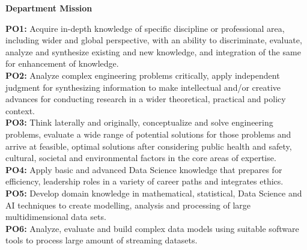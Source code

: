 \vspace{0.5cm} 
\begin{center}
	\textcolor{midnight}{\Large \textbf{Department Mission}}\\
	\begin{tcolorbox}[colback=golden!5!white,colframe=golden!75!black]
				\itshape \DepartmentMission
	\end{tcolorbox}
\end{center}

\vspace{0.5cm} 


\newpage

\begin{tcolorbox}[ enhanced, left=2mm, right=2mm, width=14cm, attach boxed title to top center={yshift=-3mm,yshifttext=-1mm}, 
	valign=center,
	colback=gray!5!white,colframe=black!75!black,colbacktitle=gray!90!black,
	title=\large Program Outcomes (POs), fonttitle=\bfseries,
	boxed title style={size=small,colframe=gray!90!black} ]
	{\scriptsize
	
	\textbf{PO1: }Acquire in-depth knowledge of specific discipline or professional area, including wider and global perspective, with an ability to discriminate, evaluate, analyze and synthesize existing and new knowledge, and integration of the same for enhancement of knowledge.\\
	\textbf{PO2: } Analyze complex engineering problems critically, apply independent judgment for synthesizing information to make intellectual and/or creative advances for conducting research in a wider theoretical, practical and policy context.\\
	\textbf{PO3: }Think laterally and originally, conceptualize and solve engineering problems, evaluate a wide range of potential solutions for those problems and arrive at feasible, optimal solutions after considering public health and safety, cultural, societal and environmental factors in the core areas of expertise.\\
	\textbf{PO4: } Apply basic and advanced Data Science knowledge that prepares for efficiency, leadership roles in a variety of career paths and integrates ethics.\\
	\textbf{PO5: } Develop domain knowledge in mathematical, statistical, Data Science and AI techniques to create modelling, analysis and processing of large multidimensional data sets.\\
	\textbf{PO6: } Analyze, evaluate and build complex data models using suitable software tools to process large amount of streaming datasets.\\

}
\end{tcolorbox}



\clearpage
